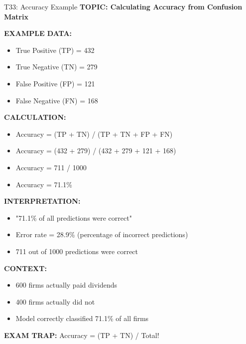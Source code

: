 \documentclass[8pt]{beamer}
\begin{document}
	\begin{frame}{T33: Accuracy Example}
		\fontsize{6.5}{7.5}\selectfont
		\textbf{TOPIC: Calculating Accuracy from Confusion Matrix}
		
		\vspace{0.1cm}
		\textbf{EXAMPLE DATA:}
		\begin{itemize}
			\item True Positive (TP) = 432
			\item True Negative (TN) = 279
			\item False Positive (FP) = 121
			\item False Negative (FN) = 168
		\end{itemize}
		
		\vspace{0.1cm}
		\textbf{CALCULATION:}
		\begin{itemize}
			\item Accuracy = (TP + TN) / (TP + TN + FP + FN)
			\item Accuracy = (432 + 279) / (432 + 279 + 121 + 168)
			\item Accuracy = 711 / 1000
			\item Accuracy = 71.1\%
		\end{itemize}
		
		\vspace{0.1cm}
		\textbf{INTERPRETATION:}
		\begin{itemize}
			\item "71.1\% of all predictions were correct"
			\item Error rate = 28.9\% (percentage of incorrect predictions)
			\item 711 out of 1000 predictions were correct
		\end{itemize}
		
		\vspace{0.1cm}
		\textbf{CONTEXT:}
		\begin{itemize}
			\item 600 firms actually paid dividends
			\item 400 firms actually did not
			\item Model correctly classified 71.1\% of all firms
		\end{itemize}
		
		\textcolor{myred}{\textbf{EXAM TRAP:}} Accuracy = \textcolor{myblue}{(TP + TN) / Total}!
	\end{frame}
	
\end{document}

